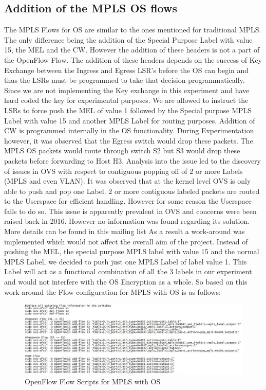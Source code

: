 \subsection{Addition of the MPLS OS flows}
The MPLS Flows for OS are similar to the ones mentioned for traditional MPLS. The only difference being the addition of the Special Purpose Label with value 15, the MEL and the CW. However the addition of these headers is not a part of the OpenFlow Flow. The addition of these headers depends on the success of Key Exchange between the Ingress and Egress LSR's before the OS can begin and thus the LSRs must be programmed to take that decision programmatically. Since we are not implementing the Key exchange in this experiment and have hard coded the key for experimental purposes. We are allowed to instruct the LSRs to force push the MEL of value 1 followed by the Special purpose MPLS Label with value 15 and another MPLS Label for routing purposes. Addition of CW is programmed internally in the OS functionality.
	During Experimentation however, it was observed that the Egress switch would drop these packets. The MPLS OS packets would route through switch S2 but S3 would drop these packets before forwarding to Host H3. Analysis into the issue led to the discovery of issues in OVS with respect to contiguous popping off of 2 or more Labels (MPLS and even VLAN). It was observed that at the kernel level OVS is only able to push and pop one Label. 2 or more contiguous labeled packets are routed to the Userspace for efficient handling. However for some reason the Userspace fails to do so. This issue is apparently prevalent in OVS and concerns were been raised back in 2016. However no information was found regarding its solution. More details can be found in this mailing list \cite{OVSmail1} \cite{OVSMail2}
    As a result a work-around was implemented which would not affect the overall aim of the project. Instead of pushing the MEL, the special purpose MPLS label with value 15 and the normal MPLS Label, we decided to push just one MPLS Label of label value 1. This Label will act as a functional combination of all the 3 labels in our experiment and would not interfere with the OS Encryption as a whole.
    So based on this work-around the Flow configuration for MPLS with OS is as follows:
    
\begin{figure}[H]
   \centering\includegraphics[width=\textwidth]{images/14_Open_Flow_flows_for_MPLS_OS.JPG}
   \caption{OpenFlow Flow Scripts for MPLS with OS}
    \label{fig:compbest}
\end{figure}

